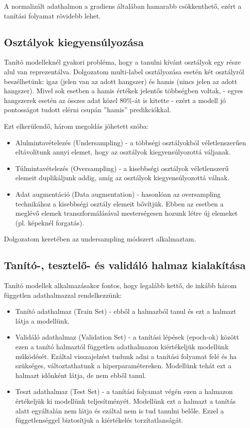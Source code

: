 A normalizált adathalmon a gradiens általában hamarabb csökkenthető, ezért a tanítási folyamat rövidebb lehet. \cite{LeCun2012}

\subsection{Osztályok kiegyensúlyozása}

Tanító modelleknél gyakori probléma, hogy a tanulni kívánt osztályok egy része alul van reprezentálva. Dolgozatom multi-label osztályozása esetén két osztályról beszélhetünk: igaz (jelen van az adott hangszer) és hamis (nincs jelen az adott hangszer). Mivel sok esetben a hamis értékek jelentős többségben voltak, - egyes hangszerek esetén az összes adat közel 80\%-át is kitette - ezért a modell jó pontosságot tudott elérni csupán ''hamis'' predikciókkal.

Ezt elkerülendő, három megoldás jöhetett szóba:
\begin{itemize}
 \item Alulmintavételezés (Undersampling) - a többségi osztályokból véletlenszerűen eltávolítunk annyi elemet, hogy az osztályok kiegyensúlyozottá váljanak.
 \item Túlmintavételezés (Oversampling) - a kisebbségi osztályok véletlenszerű elemeit duplikáljunk addig, amíg az osztályok kiegyensúlyozottá válnak.
 \item Adat augmentáció (Data augmentation) - hasonlóan az oversampling technikához a kisebbségi osztály elemeit bővítjük. Ebben az esetben a meglévő elemek transzformálásával mesterségesen hozunk létre új elemeket (pl. képeknél forgatás). \cite{imbalanced}
\end{itemize}

Dolgozatom keretében az undersampling módszert alkalmaztam.

\subsection{Tanító-, tesztelő- és validáló halmaz kialakítása}

Tanító modellek alkalmazásakor fontos, hogy legalább kettő, de inkább három független adathalmazzal rendelkezzünk: 
\begin{itemize}
 \item Tanító adathalmaz (Train Set) - ebből a halmazból tanul és ezt a halmazt látja a modellünk.
 \item Validáló adathalmaz (Validation Set) - a tanítási lépések (epoch-ok) között ezen a tanító halmaztól független adathalmazon kiértékeljük modellünk működését. Ezáltal visszajelzést tudunk adni a tanítási folyamat felé és ha szükséges, változtathatunk a hiperparamétereken. Modellünk tehát ezt a halmazt időnként látja, de nem ebből tanul.
 \item Teszt adathalmaz (Test Set) - a tanítási folyamat végén ezen a halmazon értékeljük ki modellünk teljesítményét. Modellünk ezt a halmazt a tanítás alatt egyáltalán nem látja és ezáltal nem is tud tanulni belőle. Ezzel a függetlenséggel biztosítjuk a kiértékelés torzítatlanságát. \cite{traintestvalid}
\end{itemize}

